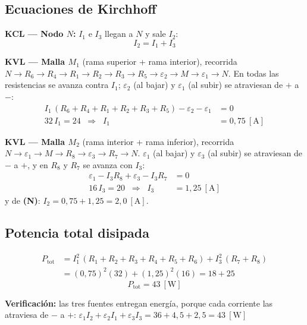 \documentclass[12pt,letterpaper]{article}
\begin{document}
\subsection*{Ecuaciones de Kirchhoff}

\textbf{KCL --- Nodo $N$:} $I_1$ e $I_3$ llegan a $N$ y sale $I_2$:
\[
    \boxed{I_2 = I_1 + I_3} \tag{N}
\]

\textbf{KVL --- Malla $M_1$} (rama superior + rama interior), recorrida
$N\to R_6\to R_4\to R_1\to R_2\to R_3\to R_5\to\varepsilon_2\to M\to\varepsilon_1\to N$. En todas las
resistencias se avanza contra $I_1$; $\varepsilon_2$ (al bajar) y $\varepsilon_1$ (al subir) se
atraviesan de $+$ a $-$:
\begin{align*}
    I_1\,(R_6+R_4+R_1+R_2+R_3+R_5) - \varepsilon_2 - \varepsilon_1 &= 0\\[2pt]
    32\,I_1 = 24 \;\;\Rightarrow\;\; I_1 &= 0{,}75\ [\text{A}]
\end{align*}

\textbf{KVL --- Malla $M_2$} (rama interior + rama inferior), recorrida
$N\to\varepsilon_1\to M\to R_8\to\varepsilon_3\to R_7\to N$. $\varepsilon_1$ (al bajar) y
$\varepsilon_3$ (al subir) se atraviesan de $-$ a $+$, y en $R_8$ y $R_7$ se avanza con $I_3$:
\begin{align*}
    \varepsilon_1 - I_3R_8 + \varepsilon_3 - I_3R_7 &= 0\\[2pt]
    16\,I_3 = 20 \;\;\Rightarrow\;\; I_3 &= 1{,}25\ [\text{A}]
\end{align*}
y de \textbf{(N)}: $I_2 = 0{,}75 + 1{,}25 = 2{,}0\ [\text{A}]$.

\subsection*{Potencia total disipada}

\begin{align*}
    P_{\text{tot}} &= I_1^2\,(R_1+R_2+R_3+R_4+R_5+R_6) + I_3^2\,(R_7+R_8)\\[2pt]
                   &= (0{,}75)^2(32) + (1{,}25)^2(16) = 18 + 25
\end{align*}
\[
    \boxed{P_{\text{tot}} = 43\ [\text{W}]}
\]

\noindent\textbf{Verificaci\'on:} las tres fuentes entregan energ\'ia, porque cada corriente las
atraviesa de $-$ a $+$:
$\varepsilon_1 I_2 + \varepsilon_2 I_1 + \varepsilon_3 I_3 = 36 + 4{,}5 + 2{,}5 = 43\ [\text{W}]$ \checkmark

\newpage

\end{document}
